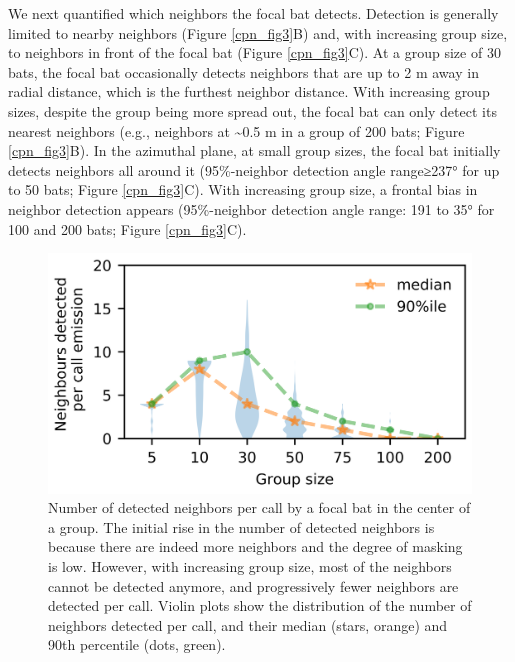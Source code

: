 \documentclass[
]{book}
\begin{document}
We next quantified which neighbors the focal bat detects. Detection is generally limited to nearby neighbors (Figure \ref{cpn_fig3}B) and, with increasing group size, to neighbors in front of the focal bat (Figure \ref{cpn_fig3}C). At a group size of 30 bats, the focal bat occasionally detects neighbors that are up to 2 m away in radial distance, which is the furthest neighbor distance. With increasing group sizes, despite the group being more spread out, the focal bat can only detect its nearest neighbors (e.g., neighbors at \textasciitilde0.5 m in a group of 200 bats; Figure \ref{cpn_fig3}B). In the azimuthal plane, at small group sizes, the focal bat initially detects neighbors all around it (95\%-neighbor detection angle range≥237° for up to 50 bats; Figure \ref{cpn_fig3}C). With increasing group size, a frontal bias in neighbor detection appears (95\%-neighbor detection angle range: 191 to 35° for 100 and 200 bats; Figure \ref{cpn_fig3}C).

\begin{figure}[!htbp]
\includegraphics[]{original_papers/CPN_figures/Figure_2/Figure2_groupsize_1200dpi.png}
\centering
\caption{Number of detected neighbors per call by a focal bat in the center of a group. The initial rise in the number of detected neighbors is because there are indeed more neighbors and the degree of masking is low. However, with increasing group size, most of the neighbors cannot be detected anymore, and progressively fewer neighbors are detected per call. Violin plots show the distribution of the number of neighbors detected per call, and their median (stars, orange) and 90th percentile (dots, green).}
\label{cpn_fig2}
\end{figure}
\end{document}
